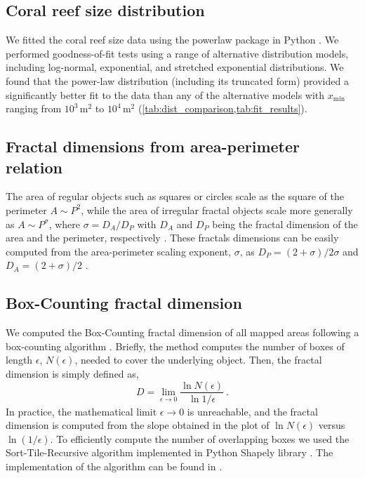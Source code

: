 \subsection{Coral reef size distribution}

We fitted the coral reef size data using the powerlaw package in Python
\cite{powerlaw, Clauset2009}. We performed goodness-of-fit tests using a range
of alternative distribution models, including log-normal, exponential, and
stretched exponential distributions. We found that the power-law distribution
(including its truncated form) provided a significantly better fit to the data
than any of the alternative models with $x_{\textrm{min}}$ ranging from
$10^3\,\textrm{m}^2$ to $10^4\,\textrm{m}^2$
(\cref{tab:dist_comparison,tab:fit_results}).

\subsection{Fractal dimensions from area-perimeter relation}

The area of regular objects such as squares or circles scale as the square
of the perimeter $A\sim P^2$, while the area of irregular fractal objects scale
more generally as $A\sim P^{\sigma}$, where $\sigma=D_A/D_P$ with $D_A$ and
$D_P$ being the fractal dimension of the area and the perimeter, respectively
\cite{MAN83, CHEN2013}. These fractals dimensions can be easily computed from
the area-perimeter scaling exponent, $\sigma$, as $D_P=(2+\sigma)/2\sigma$ and
$D_A=(2+\sigma)/2$ \cite{CHEN2013}.

\subsection{Box-Counting fractal dimension}

We computed the Box-Counting fractal dimension of all mapped areas
following a box-counting algorithm \cite{MAN83}. Briefly, the method computes
the number of boxes of length $\epsilon$, $N(\epsilon)$, needed to cover the
underlying object. Then, the fractal dimension is simply defined as,
\begin{equation}
    D=\lim_{\epsilon\to 0}\frac{\ln{N(\epsilon)}}{\ln{1/\epsilon}} \ .
\end{equation}
In practice, the mathematical limit $\epsilon\to 0$ is unreachable, and the
fractal dimension is computed from the slope obtained in the plot of $\ln
    N(\epsilon)$ versus $\ln(1/\epsilon)$. To efficiently compute the number of
overlapping boxes we used the Sort-Tile-Recursive algorithm \cite{STRtree}
implemented in Python Shapely library \cite{shapely}. The implementation of the
algorithm can be found in \cite{CODE_corals}.

